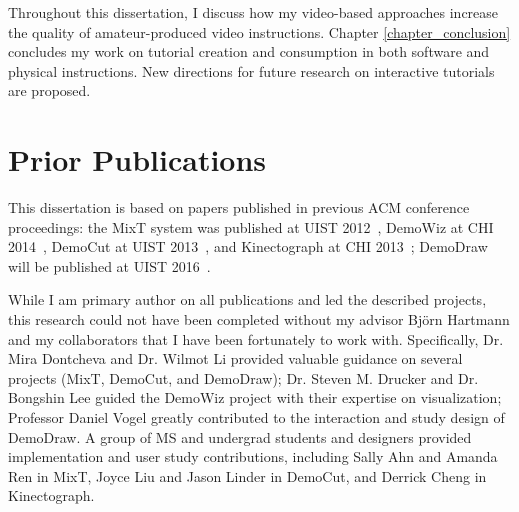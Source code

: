Throughout this dissertation, I discuss how my video-based approaches increase the quality of amateur-produced video instructions. Chapter \ref{chapter_conclusion} concludes my work on tutorial creation and consumption in both software and physical instructions. New directions for future research on interactive tutorials are proposed.


\section {Prior Publications}

This dissertation is based on papers published in previous ACM conference proceedings: the MixT system was published at UIST 2012~\cite{Chi:2012:MAG:2380116.2380130}, DemoWiz at CHI 2014~\cite{Chi:2014:DRS:2556288.2557254}, DemoCut at UIST 2013~\cite{Chi:2013:DGC:2501988.2502052}, and Kinectograph at CHI 2013~\cite{Cheng:2013:BCC:2468356.2468568}; DemoDraw will be published at UIST 2016~\cite{Chi:2016:DemoDraw}.

While I am primary author on all publications and led the described projects, this research could not have been completed without my advisor Bj\"orn Hartmann and my collaborators that I have been fortunately to work with. Specifically, Dr. Mira Dontcheva and Dr. Wilmot Li provided valuable guidance on several projects (MixT, DemoCut, and DemoDraw); Dr. Steven M. Drucker and Dr. Bongshin Lee guided the DemoWiz project with their expertise on visualization; Professor Daniel Vogel greatly contributed to the interaction and study design of DemoDraw. A group of MS and undergrad students and designers provided implementation and user study contributions, including Sally Ahn and Amanda Ren in MixT, Joyce Liu and Jason Linder in DemoCut, and Derrick Cheng in Kinectograph.

